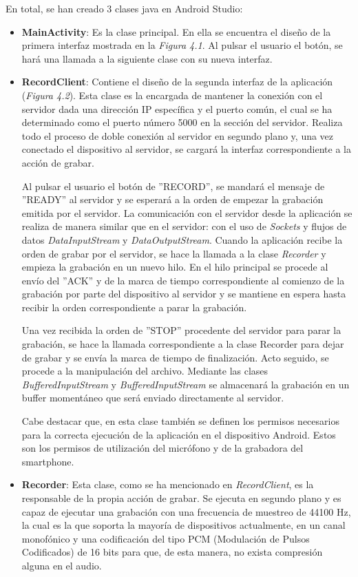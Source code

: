 \documentclass[a4paper,11pt]{book}
\begin{document}
	En total, se han creado 3 clases java en Android Studio:
	\begin{itemize}
	\item \textbf{MainActivity}: Es la clase principal. En ella se encuentra el diseño de la primera interfaz mostrada en la \textit{Figura 4.1}. Al pulsar el usuario el botón, se hará una llamada a la siguiente clase con su nueva interfaz.
	\item \textbf{RecordClient}: Contiene el diseño de la segunda interfaz de la aplicación (\textit{Figura 4.2}). Esta clase es la encargada de mantener la conexión con el servidor dada una dirección IP específica y el puerto común, el cual se ha determinado como el puerto número 5000 en la sección del servidor. Realiza todo el proceso de doble conexión al servidor en segundo plano y, una vez conectado el dispositivo al servidor, se cargará la interfaz correspondiente a la acción de grabar.
	
	Al pulsar el usuario el botón de ''RECORD'', se mandará el mensaje de ''READY'' al servidor y se esperará a la orden de empezar la grabación emitida por el servidor. La comunicación con el servidor desde la aplicación se realiza de manera similar que en el servidor: con el uso de \textit{Sockets} y flujos de datos \textit{DataInputStream} y \textit{DataOutputStream}. Cuando la aplicación recibe la orden de grabar por el servidor, se hace la llamada a la clase \textit{Recorder} y empieza la grabación en un nuevo hilo. En el hilo principal se procede al envío del ''ACK'' y de la marca de tiempo correspondiente al comienzo de la grabación por parte del dispositivo al servidor y se mantiene en espera hasta recibir la orden correspondiente a parar la grabación.
	
	Una vez recibida la orden de ''STOP'' procedente del servidor para parar la grabación, se hace la llamada correspondiente a la clase Recorder para dejar de grabar y se envía la marca de tiempo de finalización. Acto seguido, se procede a la manipulación del archivo. Mediante las clases \textit{BufferedInputStream} y \textit{BufferedInputStream} se almacenará la grabación en un buffer momentáneo que será enviado directamente al servidor.
	
	Cabe destacar que, en esta clase también se definen los permisos necesarios para la correcta ejecución de la aplicación en el dispositivo Android. Estos son los permisos de utilización del micrófono y de la grabadora del smartphone.
	
	\item \textbf{Recorder}: Esta clase, como se ha mencionado en \textit{RecordClient}, es la responsable de la propia acción de grabar. Se ejecuta en segundo plano y es capaz de ejecutar una grabación con una frecuencia de muestreo de 44100 Hz, la cual es la que soporta la mayoría de dispositivos actualmente, en un canal monofónico y una codificación del tipo PCM (Modulación de Pulsos Codificados) de 16 bits para que, de esta manera, no exista compresión alguna en el audio.
	

\end{itemize}
\end{document}
